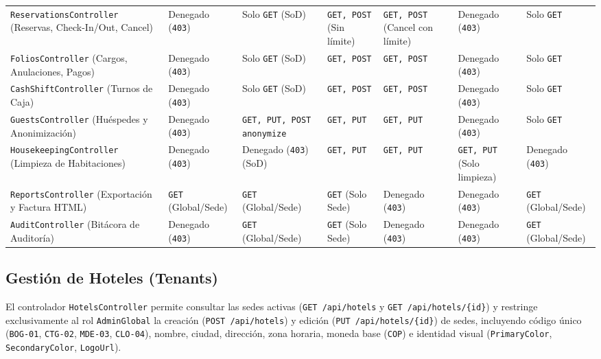 \documentclass[12pt,a4paper]{article}
\begin{document}
\begin{longtable}{p{2.9cm} p{1.6cm} p{1.8cm} p{1.7cm} p{1.9cm} p{1.8cm} p{1.6cm}}
\texttt{ReservationsController} (Reservas, Check-In/Out, Cancel) & Denegado (\texttt{403}) & Solo \texttt{GET} (SoD) & \texttt{GET, POST} (Sin l\'imite) & \texttt{GET, POST} (Cancel con l\'imite) & Denegado (\texttt{403}) & Solo \texttt{GET}\\[0.12cm]
\texttt{FoliosController} (Cargos, Anulaciones, Pagos) & Denegado (\texttt{403}) & Solo \texttt{GET} (SoD) & \texttt{GET, POST} & \texttt{GET, POST} & Denegado (\texttt{403}) & Solo \texttt{GET}\\[0.12cm]
\texttt{CashShiftController} (Turnos de Caja) & Denegado (\texttt{403}) & Solo \texttt{GET} (SoD) & \texttt{GET, POST} & \texttt{GET, POST} & Denegado (\texttt{403}) & Solo \texttt{GET}\\[0.12cm]
\texttt{GuestsController} (Hu\'espedes y Anonimizaci\'on) & Denegado (\texttt{403}) & \texttt{GET, PUT, POST anonymize} & \texttt{GET, PUT} & \texttt{GET, PUT} & Denegado (\texttt{403}) & Solo \texttt{GET}\\[0.12cm]
\texttt{HousekeepingController} (Limpieza de Habitaciones) & Denegado (\texttt{403}) & Denegado (\texttt{403}) (SoD) & \texttt{GET, PUT} & \texttt{GET, PUT} & \texttt{GET, PUT} (Solo limpieza) & Denegado (\texttt{403})\\[0.12cm]
\texttt{ReportsController} (Exportaci\'on y Factura HTML) & \texttt{GET} (Global/Sede) & \texttt{GET} (Global/Sede) & \texttt{GET} (Solo Sede) & Denegado (\texttt{403}) & Denegado (\texttt{403}) & \texttt{GET} (Global/Sede)\\[0.12cm]
\texttt{AuditController} (Bit\'acora de Auditor\'ia) & Denegado (\texttt{403}) & \texttt{GET} (Global/Sede) & \texttt{GET} (Solo Sede) & Denegado (\texttt{403}) & Denegado (\texttt{403}) & \texttt{GET} (Global/Sede)\\
\end{longtable}

\subsection{Gesti\'on de Hoteles (Tenants)}
El controlador \texttt{HotelsController} permite consultar las sedes activas (\texttt{GET /api/hotels} y \texttt{GET /api/hotels/\{id\}}) y restringe exclusivamente al rol \texttt{AdminGlobal} la creaci\'on (\texttt{POST /api/hotels}) y edici\'on (\texttt{PUT /api/hotels/\{id\}}) de sedes, incluyendo c\'odigo \'unico (\texttt{BOG-01}, \texttt{CTG-02}, \texttt{MDE-03}, \texttt{CLO-04}), nombre, ciudad, direcci\'on, zona horaria, moneda base (\texttt{COP}) e identidad visual (\texttt{PrimaryColor}, \texttt{SecondaryColor}, \texttt{LogoUrl}).
\end{document}
